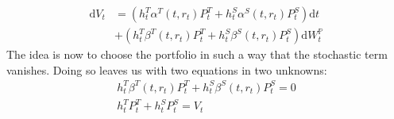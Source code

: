 \documentclass[12pt,twoside]{reedthesis}
\begin{document}
\[
\begin{aligned}
\mathrm{d} V_{t} &=\left(h_{t}^{T} \alpha^{T}\left(t, r_{t}\right) P_{t}^{T}+h_{t}^{S} \alpha^{S}\left(t, r_{t}\right) P_{t}^{S}\right) \mathrm{d} t \\
&+\left(h_{t}^{T} \beta^{T}\left(t, r_{t}\right) P_{t}^{T}+h_{t}^{S} \beta^{S}\left(t, r_{t}\right) P_{t}^{S}\right) \mathrm{d} W_{t}^{\mathbb{P}}
\end{aligned}
\]
The idea is now to choose the portfolio in such a way that the stochastic term vanishes. Doing so leaves us with two equations in two unknowns:
\[
\begin{array}{r}
h_{t}^{T} \beta^{T}\left(t, r_{t}\right) P_{t}^{T}+h_{t}^{S} \beta^{S}\left(t, r_{t}\right) P_{t}^{S}=0 \\
h_{t}^{T} P_{t}^{T}+h_{t}^{S} P_{t}^{S}=V_{t}
\end{array}
\]
\end{document}
